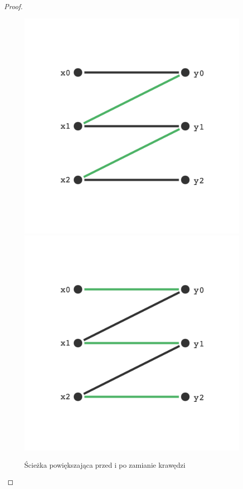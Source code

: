 \begin{proof}
      \begin{figure}[H]
          \centering
          \includegraphics[scale=0.3]{chapters/dyskretna/matchings/images/augmenting_path_before.png}
          \includegraphics[scale=0.3]{chapters/dyskretna/matchings/images/augmenting_path_after.png}
          \caption{Ścieżka powiększająca przed i po zamianie krawędzi}
      \end{figure}


\end{proof}
